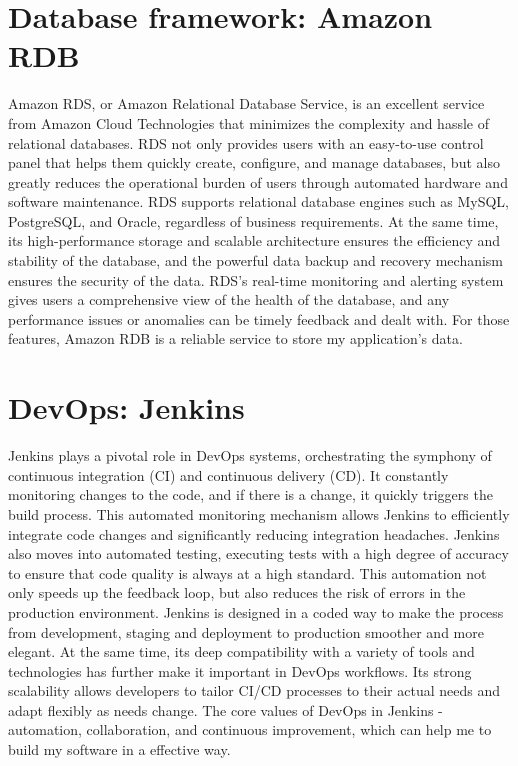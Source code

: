 \documentclass[12pt,two side]{report}
\begin{document}
\section{Database framework: Amazon RDB}
Amazon RDS, or Amazon Relational Database Service, is an excellent service from Amazon Cloud Technologies that minimizes the complexity and hassle of relational databases. RDS not only provides users with an easy-to-use control panel that helps them quickly create, configure, and manage databases, but also greatly reduces the operational burden of users through automated hardware and software maintenance. RDS supports relational database engines such as MySQL, PostgreSQL, and Oracle, regardless of business requirements. At the same time, its high-performance storage and scalable architecture ensures the efficiency and stability of the database, and the powerful data backup and recovery mechanism ensures the security of the data. RDS's real-time monitoring and alerting system gives users a comprehensive view of the health of the database, and any performance issues or anomalies can be timely feedback and dealt with. For those features, Amazon RDB is a reliable service to store my application's data. 
\section{DevOps: Jenkins}
Jenkins plays a pivotal role in DevOps systems, orchestrating the symphony of continuous integration (CI) and continuous delivery (CD). It constantly monitoring changes to the code, and if there is a change, it quickly triggers the build process. This automated monitoring mechanism allows Jenkins to efficiently integrate code changes and significantly reducing integration headaches. Jenkins also moves into automated testing, executing tests with a high degree of accuracy to ensure that code quality is always at a high standard. This automation not only speeds up the feedback loop, but also reduces the risk of errors in the production environment. Jenkins is designed in a coded way to make the process from development, staging and deployment to production smoother and more elegant. At the same time, its deep compatibility with a variety of tools and technologies has further make it important in DevOps workflows. Its strong scalability allows developers to tailor CI/CD processes to their actual needs and adapt flexibly as needs change. The core values of DevOps in Jenkins - automation, collaboration, and continuous improvement, which can help me to build my software in a effective way.
\end{document}
